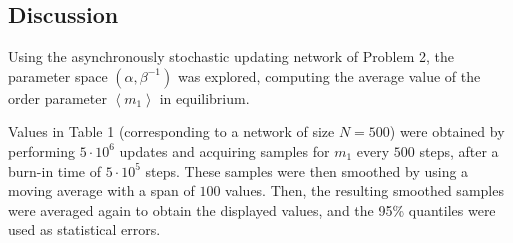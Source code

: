 \documentclass[12pt,A4,titlepage]{article}
\begin{document}
\begin{table}[H]
\footnotesize
\centering
{}
\caption{Average value $\left<m_1\right>$ of the order parameter in equilibrium. N = 1000.}
\label{table2}
\end{table}

\subsection*{Discussion}
Using the asynchronously stochastic updating network of Problem 2, the parameter space $(\alpha, \beta^{-1})$ was explored, computing the average value of the order parameter $\left<m_1\right>$ in equilibrium. 

Values in Table 1 (corresponding to a network of size $N=500$) were obtained by performing $5\cdot10^6$ updates and acquiring samples for $m_1$ every $500$ steps, after a burn-in time of $5\cdot10^5$ steps.
These samples were then smoothed by using a moving average with a span of $100$ values. Then, the resulting smoothed samples were averaged again to obtain the displayed values, and the 95\% quantiles were used as statistical errors.
\end{document}
